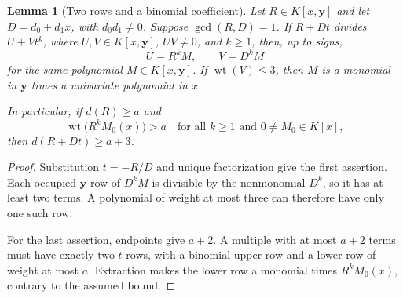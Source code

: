 \documentclass[11pt]{article}
\DeclareMathOperator{\wt}{wt}\DeclareMathOperator{\ord}{ord}
\numberwithin{equation}{section}
\newtheorem{lemma}[theorem]{Lemma}
\theoremstyle{definition}\newtheorem{definition}[theorem]{Definition}
\theoremstyle{remark}\newtheorem{remark}[theorem]{Remark}
\begin{document}
\begin{lemma}[Two rows and a binomial coefficient]
\label{lem:initial-extraction}
Let $R\in K[x,\mathbf y]$ and let $D=d_0+d_1x$, with $d_0d_1\ne0$.
Suppose $\gcd(R,D)=1$.
If $R+Dt$ divides $U+Vt^k$, where $U,V\in K[x,\mathbf y]$,
$UV\ne0$, and $k\geq1$, then, up to signs,
\[
 U=R^kM,\qquad V=D^kM
\]
for the same polynomial $M\in K[x,\mathbf y]$.
If $\wt(V)\leq3$, then $M$ is a monomial in $\mathbf y$ times a
univariate polynomial in $x$.

In particular, if $d(R)\geq a$ and
\[
 \wt\bigl(R^kM_0(x)\bigr)>a
 \quad\text{for all }k\geq1\text{ and }0\ne M_0\in K[x],
\]
then $d(R+Dt)\geq a+3$.
\end{lemma}
\begin{proof}
Substitution $t=-R/D$ and unique factorization give the first assertion.
Each occupied $\mathbf y$-row of $D^kM$ is divisible by the nonmonomial
$D^k$, so it has at least two terms.  A polynomial of weight at most three
can therefore have only one such row.

For the last assertion, endpoints give $a+2$.  A multiple with at most
$a+2$ terms must have exactly two $t$-rows, with a binomial upper row and
a lower row of weight at most $a$.  Extraction makes the lower row a
monomial times $R^kM_0(x)$, contrary to the assumed bound.
\end{proof}
\end{document}
